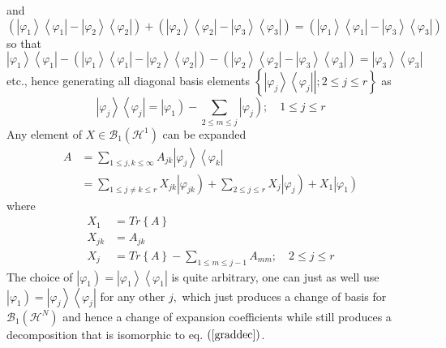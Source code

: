 \documentclass[aps,preprint]{revtex4}%
\begin{document}
and
\begin{equation}
\left(  \left\vert \varphi_{1}\right\rangle \left\langle \varphi
_{1}\right\vert -\left\vert \varphi_{2}\right\rangle \left\langle \varphi
_{2}\right\vert \right)  +\left(  \left\vert \varphi_{2}\right\rangle
\left\langle \varphi_{2}\right\vert -\left\vert \varphi_{3}\right\rangle
\left\langle \varphi_{3}\right\vert \right)  =\left(  \left\vert \varphi
_{1}\right\rangle \left\langle \varphi_{1}\right\vert -\left\vert \varphi
_{3}\right\rangle \left\langle \varphi_{3}\right\vert \right)
\end{equation}
so that
\begin{equation}
\left\vert \varphi_{1}\right\rangle \left\langle \varphi_{1}\right\vert
-\left(  \left\vert \varphi_{1}\right\rangle \left\langle \varphi
_{1}\right\vert -\left\vert \varphi_{2}\right\rangle \left\langle \varphi
_{2}\right\vert \right)  -\left(  \left\vert \varphi_{2}\right\rangle
\left\langle \varphi_{2}\right\vert -\left\vert \varphi_{3}\right\rangle
\left\langle \varphi_{3}\right\vert \right)  =\left\vert \varphi
_{3}\right\rangle \left\langle \varphi_{3}\right\vert
\end{equation}
etc., hence generating all diagonal basis elements $\left\{  \left.
\left\vert \varphi_{j}\right\rangle \left\langle \varphi_{j}\right\vert
\right\vert ;2\leq j\leq r\right\}  $ as%
\begin{equation}
\left\vert \varphi_{j}\right\rangle \left\langle \varphi_{j}\right\vert
=\left\vert \varphi_{1}\right)  -\sum_{2\leq m\leq j}\left\vert \varphi
_{j}\right)  ;\quad1\leq j\leq r
\end{equation}
Any element of $X\in\mathcal{B}_{1}\left(  \mathcal{H}^{1}\right)  $ can be
expanded%
\begin{align}
A &  =\sum_{1\leq j,k\leq\infty}A_{jk}\left\vert \varphi_{j}\right\rangle
\left\langle \varphi_{k}\right\vert \\
&  =\sum_{1\leq j\neq k\leq r}X_{jk}\left\vert \varphi_{jk}\right)
+\sum_{2\leq j\leq r}X_{j}\left\vert \varphi_{j}\right)  +X_{1}\left\vert
\varphi_{1}\right)
\end{align}
where
\begin{align}
X_{1} &  =Tr\left\{  A\right\}  \nonumber\\
X_{jk} &  =A_{jk}\nonumber\\
X_{j} &  =Tr\left\{  A\right\}  -\sum_{1\leq m\leq j-1}A_{mm};\quad2\leq j\leq
r
\end{align}
The choice of $\left\vert \varphi_{1}\right)  =\left\vert \varphi
_{1}\right\rangle \left\langle \varphi_{1}\right\vert $ is quite arbitrary,
one can just as well use $\left\vert \varphi_{1}\right)  =\left\vert
\varphi_{j}\right\rangle \left\langle \varphi_{j}\right\vert $ for any other
$j,$ which just produces a change of basis for $\mathcal{B}_{1}\left(
\mathcal{H}^{N}\right)  $ and hence a change of expansion coefficients while
still produces a decomposition that is isomorphic to eq. $\left(
\ref{graddec}\right)  $.
\end{document}
